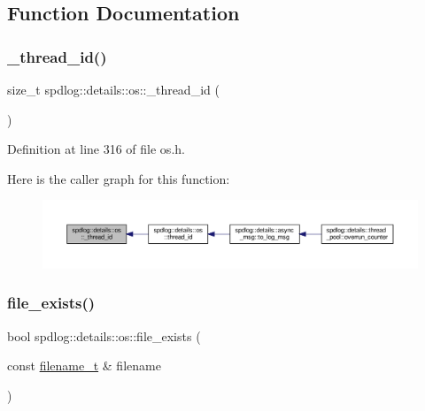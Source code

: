 \subsection{Function Documentation}
\mbox{\label{namespacespdlog_1_1details_1_1os_a4cb88fcf54ef3878c1ff660456e9819c}} 
\subsubsection{\texorpdfstring{\+\_\+thread\+\_\+id()}{\_thread\_id()}}
{\footnotesize\ttfamily size\+\_\+t spdlog\+::details\+::os\+::\+\_\+thread\+\_\+id (\begin{DoxyParamCaption}{ }\end{DoxyParamCaption})\hspace{0.3cm}{\ttfamily [inline]}}



Definition at line 316 of file os.\+h.

Here is the caller graph for this function\+:
\nopagebreak
\begin{figure}[H]
\begin{center}
\leavevmode
\includegraphics[width=350pt]{namespacespdlog_1_1details_1_1os_a4cb88fcf54ef3878c1ff660456e9819c_icgraph}
\end{center}
\end{figure}
\mbox{\label{namespacespdlog_1_1details_1_1os_a0831288e524f8cf53c98bce8facd0a0c}} 
\subsubsection{\texorpdfstring{file\+\_\+exists()}{file\_exists()}}
{\footnotesize\ttfamily bool spdlog\+::details\+::os\+::file\+\_\+exists (\begin{DoxyParamCaption}\item[{const \hyperlink{namespacespdlog_acf7ce125b3622e44f8f1702d699e0b06}{filename\+\_\+t} \&}]{filename }\end{DoxyParamCaption})\hspace{0.3cm}{\ttfamily [inline]}}



